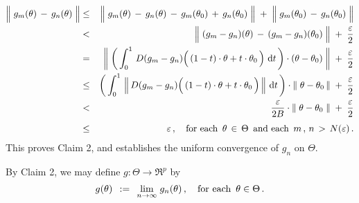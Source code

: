 \begin{eqnarray*}
\left\Vert\; g_{m}(\theta) \,\overset{{\color{white}.}}{-}\, g_{n}(\theta) \;\right\Vert
& \leq &
	\left\Vert\; g_{m}(\theta) \,\overset{{\color{white}.}}{-}\, g_{n}(\theta) \, - \, g_{m}(\theta_{0}) \,+\, g_{n}(\theta_{0}) \;\right\Vert
	\; + \;
	\left\Vert\; g_{m}(\theta_{0}) \,\overset{{\color{white}.}}{-}\, g_{n}(\theta_{0}) \;\right\Vert
\\
& < &
	\left\Vert\; (g_{m} - g_{n})(\theta) \,\overset{{\color{white}.}}{-}\, (g_{m} - g_{n})(\theta_{0}) \;\right\Vert
	\; + \;
	\dfrac{\varepsilon}{2}
\\
& = &
	\left\Vert\;
		\left(\,\int_{0}^{1}\,
			D(g_{m} - g_{n})\!\left(\,(1-t)\cdot\theta \overset{{\color{white}.}}{+} t\cdot\theta_{0}\,\right)
			\,\d t\,\right)
		\cdot
		(\theta - \theta_{0})
		\;\right\Vert
	\; + \;
	\dfrac{\varepsilon}{2}
\\
& \leq &
	\left(\,\int_{0}^{1}\,
		\left\Vert\,
			D(g_{m} - g_{n})\!\left(\,(1-t)\cdot\theta \overset{{\color{white}.}}{+} t\cdot\theta_{0}\,\right)
			\,\right\Vert
		\,\d t\,\right)
	\cdot
	\Vert\;\theta - \theta_{0}\,\Vert
	\; + \;
	\dfrac{\varepsilon}{2}
\\
& < &
	\dfrac{\varepsilon}{2 B} \cdot \left\Vert\; \theta - \theta_{0} \;\right\Vert
	\; + \;
	\dfrac{\varepsilon}{2}
\\
& \leq &
	\overset{{\color{white}1}}{\varepsilon}\,,
	\quad
	\textnormal{for each \,$\theta \,\in\, \Theta$\, and each \,$m\,,\,n \,>\, N(\varepsilon)$}\,.
\end{eqnarray*}
This proves Claim 2, and establishes the uniform convergence of $g_{n}$ on $\Theta$.

\vskip 0.5cm
\noindent
By Claim 2, we may define $g : \Theta \longrightarrow \Re^{p}$ by
\begin{equation*}
g(\theta)
\;\, := \;\,
	\underset{n\rightarrow\infty}{\lim}\; g_{n}(\theta)\,,
\quad
\textnormal{for each \,$\theta \in \Theta$}\,.
\end{equation*}

